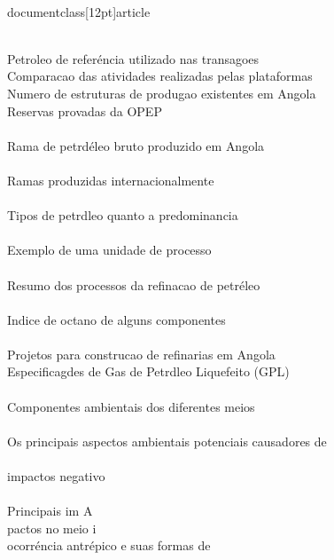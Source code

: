 \\documentclass[12pt]{article}
\begin{document}
\\
Petroleo de referéncia utilizado nas transagoes\\
Comparacao das atividades realizadas pelas plataformas\\
Numero de estruturas de produgao existentes em Angola\\
Reservas provadas da OPEP\\
\\
Rama de petrdéleo bruto produzido em Angola\\
\\
Ramas produzidas internacionalmente\\
\\
Tipos de petrdleo quanto a predominancia\\
\\
Exemplo de uma unidade de processo\\
\\
Resumo dos processos da refinacao de petréleo\\
\\
Indice de octano de alguns componentes\\
\\
Projetos para construcao de refinarias em Angola\\
Especificagdes de Gas de Petrdleo Liquefeito (GPL)\\
\\
Componentes ambientais dos diferentes meios\\
\\
Os principais aspectos ambientais potenciais causadores de\\
\\
impactos negativo\\
\\
Principais im A\\
pactos no meio i\\
ocorréncia antrépico e suas formas de\\
\\
\end{document}
